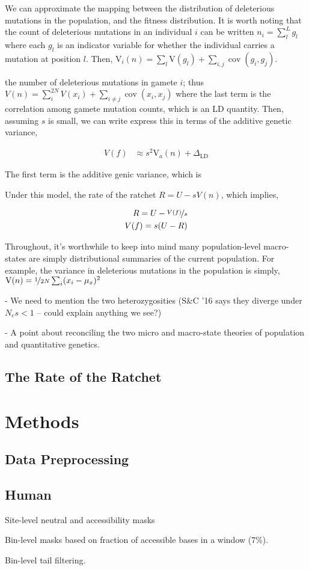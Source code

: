 \documentclass[11pt]{article}
\newcommand{\V}{\text{V}}
\DeclareMathOperator{\cov}{cov}
\begin{document}
We can approximate the mapping between the distribution of deleterious
mutations in the population, and the fitness distribution. It is worth noting
that the count of deleterious mutations in an individual $i$ can be written
$n_i = \sum_l^{L} g_l$ where each $g_l$ is an indicator variable for whether
the individual carries a mutation at position $l$. Then, $\V_i(n) = \sum_l
\V(g_l) + \sum_{i,j}\cov(g_i, g_j)$.

the
number of deleterious mutations in gamete $i$; thus $V(n) = \sum_i^{2N} V(x_i)
+ \sum_{i \ne j} \cov(x_i, x_j)$ where the last term is the correlation among
gamete mutation counts, which is an LD quantity. Then, assuming $s$ is small,
we can write express this in terms of the additive genetic variance, 

\begin{align}
  V(f) &\approx s^2 \V_a(n) + \Delta_\text{LD}
\end{align}

The first term is the additive genic variance, which is 


Under this model, the rate of the ratchet $R = U  - s V(n)$, which implies,

\begin{align}
  R = U - \nicefrac{V(f)}{s} \\
  V(f) = s(U - R)
\end{align}



Throughout, it's worthwhile to keep into mind many population-level
macro-states are simply distributional summaries of the current population. For
example, the variance in deleterious mutations in the population is simply,
$\V(n) = \nicefrac{1}{2N} \sum_i (x_i - \mu_x)^2$





- We need to mention the two heterozygosities (S\&C '16 says they diverge under
$N_e s < 1$ -- could explain anything we see?)

- A point about reconciling the two micro and macro-state theories of
population and quantitative genetics.





\subsection*{The Rate of the Ratchet}


\section*{Methods}

\subsection*{Data Preprocessing}

\subsection*{Human}

Site-level neutral and accessibility masks

Bin-level masks based on fraction of accessible bases in a window (7\%).

Bin-level tail filtering.

\printbibliography
\end{document}

